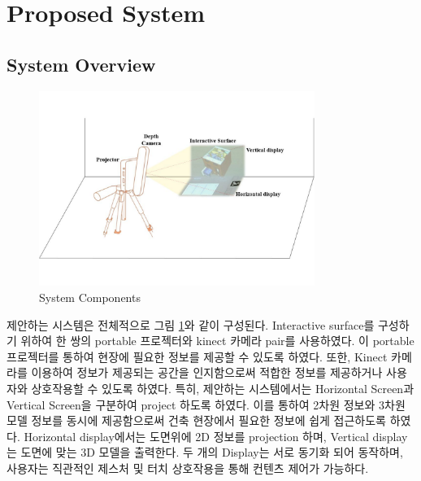 
\section{Proposed System}


\subsection{System Overview}

\begin{figure}[ht!]
	\centering
    \includegraphics[width=0.8\textwidth]{3-System/overview}
	\caption{System Components}
    \label{fig:overview}
\end{figure}

제안하는 시스템은 전체적으로 그림 \ref{fig:overview}와 같이 구성된다. Interactive surface를 구성하기 위하여 한 쌍의 portable 프로젝터와 kinect 카메라 pair를 사용하였다. 이 portable 프로젝터를 통하여 현장에 필요한 정보를 제공할 수 있도록 하였다. 또한, Kinect 카메라를 이용하여 정보가 제공되는 공간을 인지함으로써 적합한 정보를 제공하거나 사용자와 상호작용할 수 있도록 하였다. 특히, 제안하는 시스템에서는 Horizontal Screen과 Vertical Screen을 구분하여 project 하도록 하였다. 이를 통하여 2차원 정보와 3차원 모델 정보를 동시에 제공함으로써 건축 현장에서 필요한 정보에 쉽게 접근하도록 하였다. Horizontal display에서는 도면위에 2D 정보를 projection 하며, Vertical display는 도면에 맞는 3D 모델을 출력한다. 두 개의 Display는 서로 동기화 되어 동작하며, 사용자는 직관적인 제스처 및 터치 상호작용을 통해 컨텐츠 제어가 가능하다.


